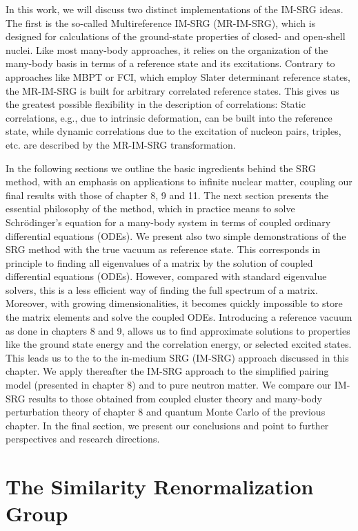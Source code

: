 In this work, we will discuss two distinct implementations of the 
IM-SRG ideas. The first is the so-called Multireference IM-SRG (MR-IM-SRG),
which is designed for calculations of the ground-state properties of 
closed- and open-shell nuclei.  Like most many-body
approaches, it relies on the organization of the many-body basis
in terms of a reference state and its excitations. 
Contrary to approaches like MBPT or FCI, which employ Slater
determinant reference states, the MR-IM-SRG is built for arbitrary
correlated reference states. This gives us the greatest possible
flexibility in the description of correlations: Static correlations,
e.g., due to intrinsic deformation, can be built into the reference
state, while dynamic correlations due to the excitation of nucleon pairs, 
triples, etc. are described by the MR-IM-SRG transformation. 

In the following sections we outline the basic ingredients behind the
SRG method, with an emphasis on applications to infinite nuclear
matter, coupling our final results with those of chapter 8, 9 and
11. The next section presents the essential philosophy of the method,
which in practice means to solve Schr\"odinger's equation for a
many-body system in terms of coupled ordinary differential equations
(ODEs). We present also two simple demonstrations of the SRG method with the true vacuum as reference state. This corresponds in principle to finding all eigenvalues of a matrix by the solution of coupled differential equations (ODEs). 
However, compared with standard eigenvalue solvers, this is a less efficient way of finding the full spectrum of a matrix. 
Moreover, with growing dimensionalities, it becomes quickly impossible to store the matrix elements and solve the coupled ODEs. 
Introducing a reference vacuum as done in chapters 8 and 9, allows us to find approximate solutions to properties  like the  ground state energy and the correlation energy, or selected excited states. This leads us to the
to the in-medium SRG (IM-SRG) approach discussed in this chapter. 
We apply thereafter the IM-SRG approach to the simplified pairing  model (presented in chapter 8) and 
to pure neutron matter. We compare our IM-SRG results to those obtained from coupled cluster theory and many-body perturbation theory of  chapter 8 and quantum Monte Carlo of the previous chapter.  In the final section, we present our conclusions and point  to further
perspectives and research directions.

\section{The Similarity Renormalization Group}
